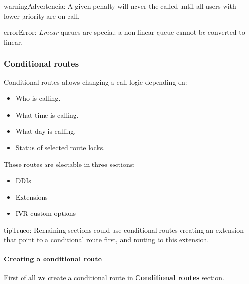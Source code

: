 \documentclass[letterpaper,10pt,spanish]{sphinxmanual}
\begin{document}
\begin{notice}{warning}{Advertencia:}
A given penalty will never the called until all users with lower priority are on call.
\end{notice}

\begin{notice}{error}{Error:}
\emph{Linear} queues are special: a non-linear queue cannot be converted to linear.
\end{notice}


\subsubsection{Conditional routes}
\label{administration_portal/client/vpbx/routing_endpoints/conditional_routes::doc}\label{administration_portal/client/vpbx/routing_endpoints/conditional_routes:conditional-routes}\label{administration_portal/client/vpbx/routing_endpoints/conditional_routes:id1}
Conditional routes allows changing a call logic depending on:
\begin{itemize}
\item {} 
Who is calling.

\item {} 
What time is calling.

\item {} 
What day is calling.

\item {} 
Status of selected route locks.

\end{itemize}

These routes are electable in three sections:
\begin{itemize}
\item {} 
DDIs

\item {} 
Extensions

\item {} 
IVR custom options

\end{itemize}

\begin{notice}{tip}{Truco:}
Remaining sections could use conditional routes creating an extension
that point to a conditional route first, and routing to this extension.
\end{notice}


\paragraph{Creating a conditional route}
\label{administration_portal/client/vpbx/routing_endpoints/conditional_routes:creating-a-conditional-route}
First of all we create a conditional route in \textbf{Conditional routes} section.
\end{document}
